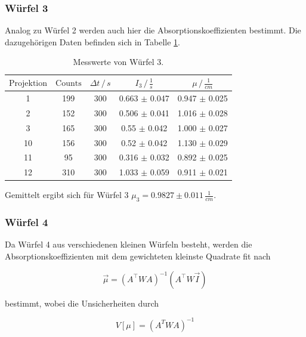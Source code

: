   
  
\subsubsection{Würfel 3}

\noindent
Analog zu Würfel 2 werden auch hier die Absorptionskoeffizienten bestimmt.
Die dazugehörigen Daten befinden sich in Tabelle \ref{tab:w3}.

\begin{table}
\centering
{}
\begin{tabular}{c c c c c}
\toprule
$\text{Projektion}$ & $\text{Counts}$ & $\Delta t \,/\, s $ & $I_3 \,/\, \frac{1}{s} $ & $\mu \,/\, \frac{1}{cm} $\\
 \midrule 
 1 & 199  & 300 & 0.663 $\pm$ 0.047 & 0.947 $\pm$ 0.025  \\
 2 & 152  & 300 & 0.506 $\pm$ 0.041 & 1.016 $\pm$  0.028 \\
 3 & 165  & 300 & 0.55 $\pm$ 0.042  & 1.000 $\pm$ 0.027 \\
 10 & 156 & 300& 0.52 $\pm$  0.042  & 1.130 $\pm$  0.029\\
 11 & 95  & 300& 0.316 $\pm$ 0.032  & 0.892 $\pm$ 0.025 \\
 12 & 310 & 300& 1.033 $\pm$ 0.059  & 0.911 $\pm$ 0.021 \\
\bottomrule
\end{tabular}
\caption{Messwerte von Würfel 3.}
\label{tab:w3}
\end{table}

\noindent
Gemittelt ergibt sich für Würfel 3 $\mu_3 = 0.9827 \pm 0.011 \, \frac{1}{cm}$.

\subsubsection{Würfel 4}




    \noindent
    Da Würfel 4 aus verschiedenen kleinen Würfeln besteht, werden die Absorptionskoeffizienten mit dem gewichteten kleinste Quadrate fit nach
  
  \begin{equation}
  \vec{\mu} = ( A^\top W A)^{-1}(A^\top W \vec{I})
  \label{eqn:mu4}
  \end{equation}
  
  \noindent
  bestimmt, wobei die Unsicherheiten durch

  \begin{equation}
    V[\mu]= (A^{T}WA)^{-1}
    \label{eq7}
  \end{equation}

